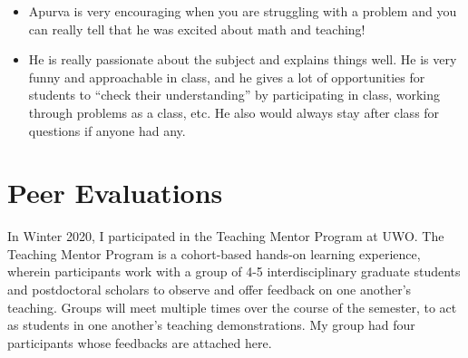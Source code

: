 \documentclass[
]{report}
\begin{document}
\begin{itemize}
  (like the other two), but there is a strong system of support from office hours and studying with MENU friends that makes the course
  doable.
\item
  Apurva is very encouraging when you are struggling with a problem and you can really tell that he was excited about math and
  teaching!\\
\item
  He is really passionate about the subject and explains things well. He is very funny and approachable in class, and he gives a lot of
  opportunities for students to ``check their understanding'' by participating in class, working through problems as a class, etc. He
  also would always stay after class for questions if anyone had any.
\end{itemize}

\hypertarget{peer-evaluations}{%
\section{Peer Evaluations}\label{peer-evaluations}}

In Winter 2020, I participated in the Teaching Mentor Program at UWO.
The Teaching Mentor Program is a cohort-based hands-on learning experience, wherein participants
work with a group of 4-5 interdisciplinary graduate students and postdoctoral scholars to observe
and offer feedback on one another's teaching. Groups will meet multiple times over the course of
the semester, to act as students in one another's teaching demonstrations. My group had four
participants whose feedbacks are attached here.
\end{document}

